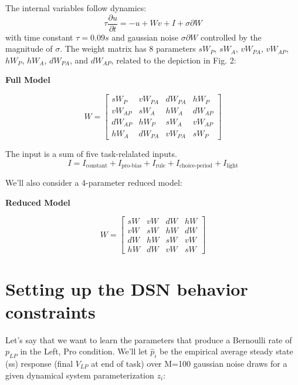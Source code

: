 \documentclass[11pt]{article}
\begin{document}
 The internal variables follow dynamics:
\begin{equation}
\tau \frac{\partial u}{\partial t} = -u + Wv + I + \sigma \partial W
\end{equation}
with time constant $\tau = 0.09s$ and gaussian noise $\sigma \partial W$ controlled by the magnitude of $\sigma$.  The weight matrix has 8 parameters $sW_P$, $sW_A$, $vW_{PA}$, $vW_{AP}$, $hW_P$, $hW_A$, $dW_{PA}$, and $dW_{AP}$,  related to the depiction in Fig. 2:
\begin{center}
\textbf{Full Model} \\
\end{center}
\begin{equation}
W = \begin{bmatrix} sW_P & vW_{PA} &  dW_{PA} & hW_P \\ vW_{AP}  & sW_A & hW_A  & dW_{AP} \\ dW_{AP} & hW_P & sW_A & vW_{AP}  \\  hW_A & dW_{PA} & vW_{PA}  & sW_P \end{bmatrix}
\end{equation}

The input is a sum of five task-relalated inputs.
\begin{equation}
I = I_{\text{constant}} + I_{\text{pro-bias}} + I_{\text{rule}} + I_{\text{choice-period}} + I_{\text{light}}
\end{equation}

We'll also consider a 4-parameter reduced model:
\begin{center}
\textbf{Reduced Model} \\
\end{center}
\begin{equation}
W = \begin{bmatrix} sW & vW &  dW & hW \\ vW  & sW & hW  & dW \\ dW & hW & sW & vW \\  hW & dW & vW  & sW \end{bmatrix}
\end{equation}

\section{Setting up the DSN behavior constraints}

Let's say that we want to learn the parameters that produce a Bernoulli rate of $p_{LP}$ in the Left, Pro condition.  We'll let $\hat{p}_i$ be the empirical average steady state (ss) response (final $V_{LP}$ at end of task) over M=100 gaussian noise draws for a given dynamical system parameterization $z_i$:
\end{document}
